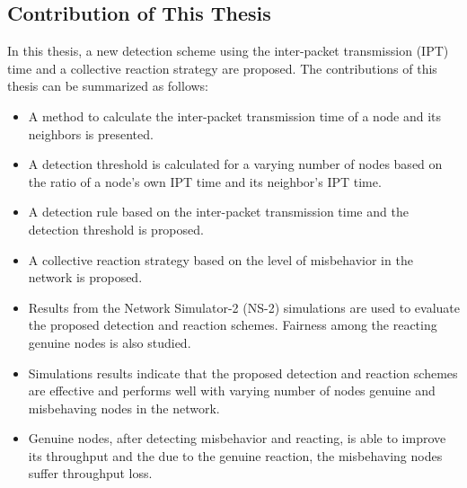\documentclass[12pt,letterpaper,english]{article}
\begin{document}
\subsection{Contribution of This Thesis}
\indent In this thesis, a new detection scheme using the inter-packet transmission (IPT) time and a collective reaction strategy are proposed. The contributions of this thesis can be summarized as follows:
\begin{itemize}
\item A method to calculate the inter-packet transmission time of a node and its neighbors is presented.
\item A detection threshold is calculated for a varying number of nodes based on the ratio of a node's own IPT time and its neighbor's IPT time. 
\item A detection rule based on the inter-packet transmission time and the detection threshold is proposed.
\item A collective reaction strategy based on the level of misbehavior in the network is proposed.
\item Results from the Network Simulator-2 (NS-2) simulations are used to evaluate the proposed detection and reaction schemes. Fairness among the reacting genuine nodes is also studied.
\item Simulations results indicate that the proposed detection and reaction schemes are effective and performs well with varying number of nodes genuine and misbehaving nodes in the network. 
\item Genuine nodes, after detecting misbehavior and reacting, is able to improve its throughput and the due to the genuine  reaction, the misbehaving nodes suffer throughput loss.
\end{itemize}
\end{document}

